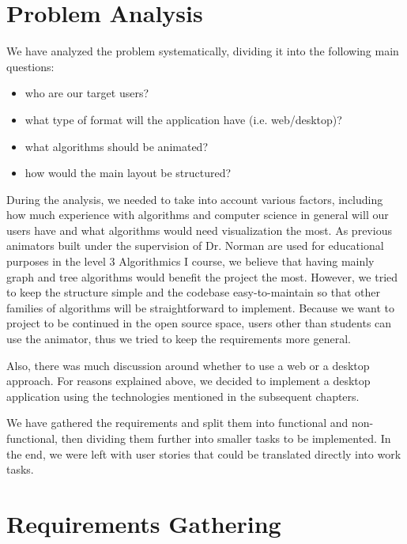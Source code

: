 \documentclass{l4proj}
\begin{document}
\section{Problem Analysis}

We have analyzed the problem systematically, dividing it into the following main questions:

\begin{itemize}
\item who are our target users?
\item what type of format will the application have (i.e. web/desktop)?
\item what algorithms should be animated?
\item how would the main layout be structured?
\end{itemize}

During the analysis, we needed to take into account various factors, including how much experience with algorithms and
computer science in general will our users have and what algorithms would need visualization the most. As previous animators built under the supervision of Dr. Norman are used for educational purposes in the level 3 Algorithmics I course, we believe that having mainly graph and tree algorithms would benefit the project the most. However, we tried to keep the structure simple and the codebase easy-to-maintain so that other families of algorithms will be straightforward to implement. Because we want to project to be continued in the open source space, users other than students can use the animator, thus we tried to keep the requirements more general.

Also, there was much discussion around whether to use a web or a desktop approach. For reasons explained above, we
decided to implement a desktop application using the technologies mentioned in the subsequent chapters.

We have gathered the requirements and split them into functional and non-functional, then dividing them further into
smaller tasks to be implemented. In the end, we were left with user stories that could be translated directly into work tasks.

\section{Requirements Gathering}
\end{document}
